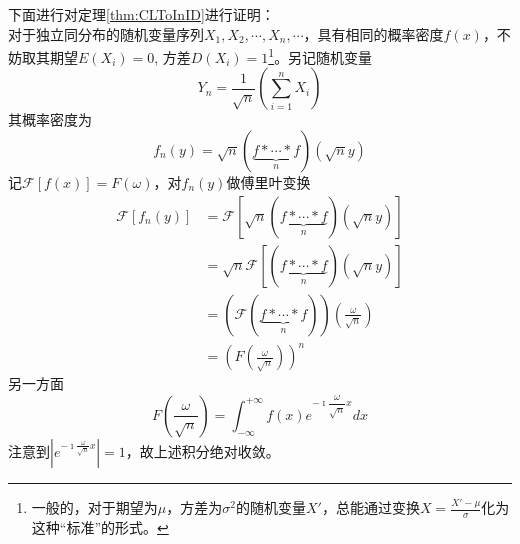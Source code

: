 \documentclass[a4paper]{ctexart}
\begin{document}
    下面进行对定理\ref{thm:CLToInID}进行证明：\\
    对于独立同分布的随机变量序列$ X_{1},X_{2},\cdots ,X_{n},\cdots $，具有相同的概率密度$f(x)$，不妨取其期望$E(X_{i})=0$, 方差$D(X_{i})=1$\footnote{一般的，对于期望为$\mu$，方差为$\sigma^{2}$的随机变量$X'$，总能通过变换$X=\frac{X'-\mu}{\sigma}$化为这种“标准”的形式。}。另记随机变量
    \begin{equation*}
      Y_{n} = \frac{1}{\sqrt{n}}(\sum_{i=1}^{n}X_{i} )
    \end{equation*}
    其概率密度为
    \begin{equation*}
      f_{n}(y) = \sqrt{n}(\underbrace{ f\ast\cdots\ast f}_{n})(\sqrt{n}y)
    \end{equation*}
    记$\mathcal{F} [f(x)]=F(\omega)$，对$f_{n}(y)$做傅里叶变换
    \begin{align}\label{eq:Yfourier}
      \mathcal{F} [f_{n}(y)] &= \mathcal{F} [\sqrt{n}(\underbrace{ f\ast\cdots\ast f}_{n})(\sqrt{n}y)] \nonumber\\
      &= \sqrt{n}\mathcal{F} [(\underbrace{ f\ast\cdots\ast f}_{n})(\sqrt{n}y)] \nonumber\\
      &= (\mathcal{F} (\underbrace{ f\ast\cdots\ast f}_{n}))(\frac{\omega}{\sqrt{n}}) \nonumber\\
      &= (F(\frac{\omega}{\sqrt{n}}))^{n}
    \end{align}
    另一方面
    \begin{equation}\label{eq:fourierdef}
      F(\frac{\omega}{\sqrt{n}}) = \int_{-\infty}^{+\infty}f(x)e^{-\imath\dfrac{\omega}{\sqrt{n}}x}dx
    \end{equation}
    注意到$|e^{-\imath\frac{\omega}{\sqrt{n}}x}|=1$，故上述积分绝对收敛。
\end{document}
